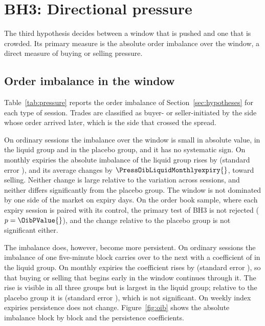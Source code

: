 \section{BH3: Directional pressure}\label{sec:bh3}\label{sec:pressure}

The third hypothesis decides between a window that is pushed and one that is crowded. Its primary measure is the absolute order imbalance over the window, a direct measure of buying or selling pressure.

\subsection{Order imbalance in the window}

Table~\ref{tab:pressure} reports the order imbalance of Section~\ref{sec:hypotheses} for
each type of session. Trades are classified as buyer- or seller-initiated by the side whose
order arrived later, which is the side that crossed the spread.

On ordinary sessions the imbalance over the window is small in absolute value,
\PressAbsoibLiquidNormal{} in the liquid group and \PressAbsoibPlaceboNormal{} in the placebo
group, and it has no systematic sign. On monthly expiries the absolute imbalance of the liquid
group rises by \PressAbsoibLiquidMonthlyexpiry{} (standard error
\PressAbsoibLiquidMonthlyexpirySe{}), and its average changes by $\PressOibLiquidMonthlyexpiry{}$, toward selling. Neither change is large relative to the variation across
sessions, and neither differs significantly from the placebo group. The window is not
dominated by one side of the market on expiry days. On the order book sample, where each
expiry session is paired with its control, the primary test of BH3 is not rejected
($p = \OibPValue{}$), and the change relative to the placebo group is not significant either.

The imbalance does, however, become more persistent. On ordinary sessions the imbalance of one
five-minute block carries over to the next with a coefficient of
\OibdynPersistenceLiquidLag{} in the liquid group. On monthly expiries the coefficient rises by
\OibdynPersistenceLiquidLagxmonthlyexpiry{} (standard error
\OibdynPersistenceLiquidLagxmonthlyexpirySe{}), so that buying or selling that begins early in
the window continues through it. The rise is visible in all three groups but is largest in
the liquid group; relative to the placebo group it is \OibdynPersistenceDidliquidLagxmonthlyexpiry{}
(standard error \OibdynPersistenceDidliquidLagxmonthlyexpirySe{}), which is not significant.
On weekly index expiries persistence does not change. Figure~\ref{fig:oib} shows the absolute
imbalance block by block and the persistence coefficients.

